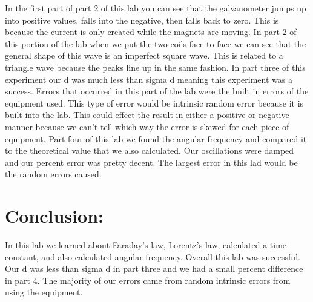 \documentclass{article}
\begin{document}
In the first part of part 2 of this lab you can see that the galvanometer jumps up into positive values, falls into the negative, then falls back to zero.  This is because the current is only created while the magnets are moving.  In part 2 of this portion of the lab when we put the two coils face to face we can see that the general shape of this wave is an imperfect square wave.  This is related to a triangle wave because the peaks line up in the same fashion.  In part three of this experiment our d was much less than sigma d meaning this experiment was a success.  Errors that occurred in this part of the lab were the built in errors of the equipment used.  This type of error would be intrinsic random error because it is built into the lab. This could effect the result in either a positive or negative manner because we can't tell which way the error is skewed for each piece of equipment.  Part four of this lab we found the angular frequency and compared it to the theoretical value that we also calculated.  Our oscillations were damped and our percent error was pretty decent.  The largest error in this lad would be the random errors caused.
  
  


\singlespace
\newpage

\section*{Conclusion:}
In this lab we learned about Faraday's law, Lorentz's law, calculated a time constant, and also calculated angular frequency. Overall this lab was successful.  Our d was less than sigma d in part three and we had a small percent difference in part 4.  The majority of our errors came from random intrinsic errors from using the equipment.
\end{document}
